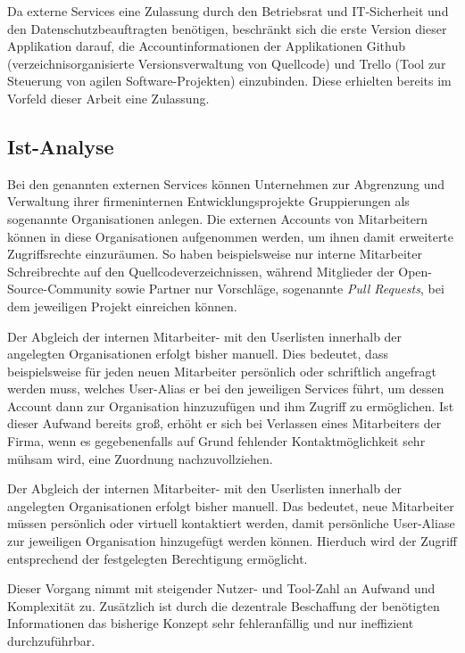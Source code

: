 Da externe Services eine Zulassung durch den Betriebsrat und IT-Sicherheit und den Datenschutzbeauftragten
benötigen, beschränkt sich die erste Version dieser Applikation darauf, die Accountinformationen der
Applikationen Github (verzeichnisorganisierte Versionsverwaltung von Quellcode) und Trello
(Tool zur Steuerung von agilen Software-Projekten) einzubinden. Diese erhielten bereits im Vorfeld
dieser Arbeit eine Zulassung.

\subsection{Ist-Analyse}
\label{sec:Ist-Analyse}
Bei den genannten externen Services können Unternehmen zur Abgrenzung und
Verwaltung ihrer firmeninternen Entwicklungsprojekte Gruppierungen als sogenannte Organisationen anlegen.
Die externen Accounts von Mitarbeitern können in diese Organisationen aufgenommen werden,
um ihnen damit erweiterte Zugriffsrechte einzuräumen.
So haben beispielsweise nur interne Mitarbeiter Schreibrechte auf den Quellcodeverzeichnissen, während
Mitglieder der Open-Source-Community sowie Partner nur Vorschläge, sogenannte
\textit{Pull Requests}, bei dem jeweiligen Projekt einreichen können.

Der Abgleich der internen Mitarbeiter- mit den Userlisten innerhalb der angelegten Organisationen
erfolgt bisher manuell. Dies bedeutet, dass beispielsweise für jeden neuen
Mitarbeiter persönlich oder schriftlich angefragt werden muss, welches User-Alias er bei den
jeweiligen Services führt, um dessen Account dann zur Organisation hinzuzufügen und ihm
Zugriff zu ermöglichen. Ist dieser Aufwand bereits groß, erhöht er sich bei Verlassen eines Mitarbeiters
der Firma, wenn es gegebenenfalls auf Grund fehlender Kontaktmöglichkeit sehr mühsam wird, eine Zuordnung
nachzuvollziehen.

Der Abgleich der internen Mitarbeiter- mit den Userlisten innerhalb der angelegten Organisationen
erfolgt bisher manuell. Das bedeutet, neue Mitarbeiter müssen persönlich oder virtuell
kontaktiert werden, damit persönliche User-Aliase zur jeweiligen Organisation hinzugefügt
werden können. Hierduch wird der Zugriff entsprechend der festgelegten Berechtigung ermöglicht.

Dieser Vorgang nimmt mit steigender Nutzer- und Tool-Zahl an Aufwand und Komplexität zu.
Zusätzlich ist durch die dezentrale Beschaffung der benötigten Informationen das bisherige
Konzept sehr fehleranfällig und nur ineffizient durchzuführbar.

